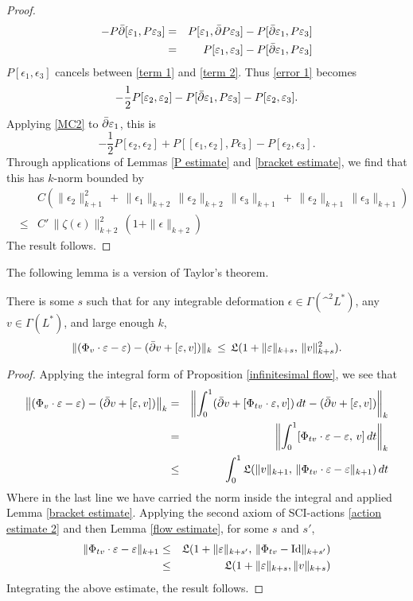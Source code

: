 \documentclass{article}
\begin{document}
\begin{proof}
\begin{eqnarray}
-P\bar\del[\epsilon_1,P\epsilon_3] &=& P[\epsilon_1,\bar\del P\epsilon_3]
- P[\bar\del\epsilon_1, P\epsilon_3] \notag \\
&=& P[\epsilon_1,\epsilon_3] - P[\bar\del\epsilon_1, P\epsilon_3] \label{term 2}
\end{eqnarray}
$P[\epsilon_1,\epsilon_3]$ cancels between \eqref{term 1} and \eqref{term 2}.  Thus \eqref{error 1} becomes
$$-\frac{1}{2} P[\varepsilon_2,\varepsilon_2] - P[\bar{\partial}\varepsilon_1, P\varepsilon_3] - P[\varepsilon_2,\varepsilon_3].$$
Applying \eqref{MC2} to $\bar{\partial}\varepsilon_1$, this is
$$-\frac{1}{2} P[\epsilon_2,\epsilon_2] + P[[\epsilon_1,\epsilon_2], P\epsilon_3] - P[\epsilon_2,\epsilon_3].$$
Through applications of Lemmas \ref{P estimate} and \ref{bracket estimate}, we find that this has $k$-norm bounded by
\begin{eqnarray*}
& &C \left( \|\epsilon_2\|_{k+1}^2 \,+\, \|\epsilon_1\|_{k+2} \, \|\epsilon_2\|_{k+2} \, \|\epsilon_3\|_{k+1}  
\,+\, \|\epsilon_2\|_{k+1}\, \|\epsilon_3\|_{k+1} \right) \\
&\leq& C'\, \|\zeta(\epsilon)\|_{k+2}^2 \, (1 + \|\epsilon\|_{k+2})
\end{eqnarray*}
The result follows.
\end{proof}

The following lemma is a version of Taylor's theorem.
\begin{lem}\label{Taylor estimate}
There is some $s$ such that for any integrable deformation $\epsilon \in \Gamma(\^ ^2 L^*)$, any $v \in \Gamma(L^*)$, and large enough $k$, 
$$\|(\Phi_v\cdot\varepsilon - \varepsilon) - (\bar{\partial} v + [\varepsilon,v])\|_k \,\leq\, \mathfrak{L}(1+\|\varepsilon\|_{k+s},\, \|v\|_{k+s}^2).$$
\end{lem}
\begin{proof}
Applying the integral form of Proposition \ref{infinitesimal flow}, we see that
\begin{eqnarray*}
\left\|(\Phi_v\cdot\varepsilon - \varepsilon) - (\bar{\partial} v + [\varepsilon,v])\right\|_k
&=& \left\|\int_0^1 (\bar{\partial} v + [\Phi_{tv}\cdot\varepsilon,v])\, dt - (\bar{\partial} v + [\varepsilon,v])\right\|_k \\
&=& \left\|\int_0^1 [\Phi_{tv}\cdot\varepsilon - \varepsilon,\,v]\, dt\right\|_k \\
&\leq& \int_0^1 \mathfrak{L}(\|v\|_{k+1},\, \|\Phi_{tv}\cdot\varepsilon - \varepsilon\|_{k+1})\, dt
\end{eqnarray*}
Where in the last line we have carried the norm inside the integral and applied Lemma \eqref{bracket estimate}.  Applying the second axiom of SCI-actions \eqref{action estimate 2} and then Lemma \ref{flow estimate}, for some $s$ and $s'$,
\begin{eqnarray*}
\|\Phi_{tv}\cdot\varepsilon - \varepsilon\|_{k+1} &\leq& \mathfrak{L}(1+\|\varepsilon\|_{k+s'},\, \|\Phi_{tv}-\textrm{Id}\|_{k+s'}) \\
&\leq& \mathfrak{L}(1+\|\varepsilon\|_{k+s},\|v\|_{k+s})
\end{eqnarray*}
Integrating the above estimate, the result follows.
\end{proof}
\end{document}
